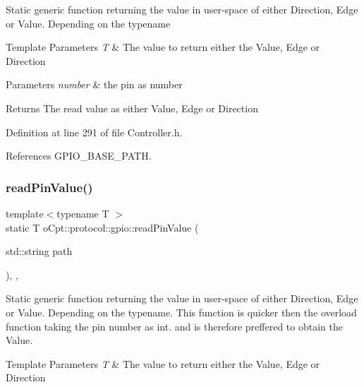 Static generic function returning the value in user-\/space of either Direction, Edge or Value. Depending on the typename 
\begin{DoxyTemplParams}{Template Parameters}
{\em T} & The value to return either the Value, Edge or Direction \\
\hline
\end{DoxyTemplParams}

\begin{DoxyParams}{Parameters}
{\em number} & the pin as number \\
\hline
\end{DoxyParams}
\begin{DoxyReturn}{Returns}
The read value as either Value, Edge or Direction 
\end{DoxyReturn}


Definition at line 291 of file Controller.\+h.



References G\+P\+I\+O\+\_\+\+B\+A\+S\+E\+\_\+\+P\+A\+TH.

\hypertarget{classo_cpt_1_1protocol_1_1gpio_a3e50919a9b9712884d4e868487821dc6}{}\label{classo_cpt_1_1protocol_1_1gpio_a3e50919a9b9712884d4e868487821dc6} 
\subsubsection{\texorpdfstring{read\+Pin\+Value()}{readPinValue()}\hspace{0.1cm}{\footnotesize\ttfamily [2/2]}}
{\footnotesize\ttfamily template$<$typename T $>$ \\
static T o\+Cpt\+::protocol\+::gpio\+::read\+Pin\+Value (\begin{DoxyParamCaption}\item[{std\+::string}]{path }\end{DoxyParamCaption})\hspace{0.3cm}{\ttfamily [inline]}, {\ttfamily [static]}, {\ttfamily [private]}}

Static generic function returning the value in user-\/space of either Direction, Edge or Value. Depending on the typename. This function is quicker then the overload function taking the pin number as int. and is therefore preffered to obtain the Value. 
\begin{DoxyTemplParams}{Template Parameters}
{\em T} & The value to return either the Value, Edge or Direction \\
\hline
\end{DoxyTemplParams}

